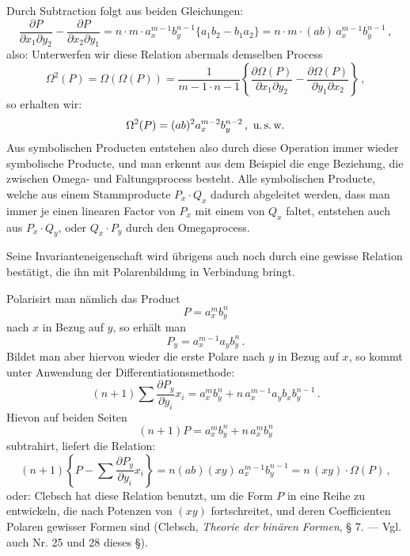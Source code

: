 Durch Subtraction folgt aus beiden Gleichungen:
\[
\frac{\partial P}{\partial x_1\partial y_2} - \frac{\partial P}{\partial x_2\partial y_1} = n\cdot m\cdot a_x^{m-1}b_y^{n-1}\{a_1b_2 - b_1a_2\} = n\cdot m\cdot(ab)\,a_x^{m-1}b_y^{n-1}\,,
\]
also:
Unterwerfen wir diese Relation abermals demselben Process
\[
\Omega^2(P) = \Omega(\Omega(P)) = \frac{1}{m-1\cdot n-1}\left\{\frac{\partial\Omega(P)}{\partial x_1\partial y_2} - \frac{\partial\Omega(P)}{\partial y_1\partial x_2}\right\}\,,
\]
so erhalten wir:
\[
\Omega^2(P) = (ab)^2 a_x^{m-2}b_y^{n-2}\,, \text{ u.\,s.\,w.}
\]
Aus symbolischen Producten entstehen also durch diese Operation immer wieder symbolische Producte, und man erkennt aus dem Beispiel die enge Beziehung, die zwischen Omega- und Faltungsprocess besteht. Alle symbolischen Producte, welche aus einem Stammproducte $P_x\cdot Q_x$ dadurch abgeleitet werden, dass man immer je einen linearen Factor von $P_x$ mit einem von $Q_x$ faltet, entstehen auch aus $P_x\cdot Q_y$, oder $Q_x\cdot P_y$ durch den Omegaprocess.

Seine Invarianteneigenschaft wird übrigens auch noch durch eine gewisse Relation bestätigt, die ihn mit Polarenbildung in Verbindung bringt.

Polarisirt man nämlich das Product
\[
P = a_x^m b_y^n
\]
nach $x$ in Bezug auf $y$, so erhält man
\[
P_y = a_x^{m-1}a_y b_y^n\,.
\]
Bildet man aber hiervon wieder die erste Polare nach $y$ in Bezug auf $x$, so kommt unter Anwendung der Differentiationsmethode:
\[
(n+1)\sum\frac{\partial P_y}{\partial y_i}x_i = a_x^m b_y^n + n\,a_x^{m-1}a_y b_x b_y^{n-1}\,.
\]
Hievon auf beiden Seiten
\[
(n+1)P = a_x^m b_y^n + n\,a_x^m b_y^n
\]
subtrahirt, liefert die Relation:
\[
(n+1)\left\{P - \sum\frac{\partial P_y}{\partial y_i}x_i\right\} = n(ab)(xy)\,a_x^{m-1}b_y^{n-1} = n\,(xy)\cdot\Omega(P)\,,
\]
oder:
Clebsch hat diese Relation benutzt, um die Form $P$ in eine Reihe zu entwickeln, die nach Potenzen von $(xy)$ fortschreitet, und deren Coefficienten Polaren gewisser Formen sind (Clebsch, \textit{Theorie der binären Formen}, § 7. — Vgl. auch Nr. 25 und 28 dieses §).



